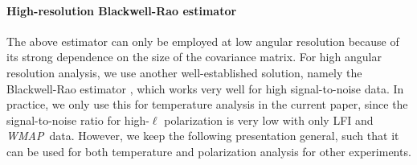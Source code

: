 \documentclass[onecolumn]{aa}
\def\WMAP{\emph{WMAP}}
\begin{document}
\paragraph{High-resolution Blackwell-Rao estimator}

The above estimator can only be employed at low angular resolution
because of its strong dependence on the size of the covariance
matrix. For high angular resolution analysis, we use another
well-established solution, namely the Blackwell-Rao estimator
\citep{chu2005}, which works very well for high signal-to-noise
data. In practice, we only use this for temperature analysis in the
current paper, since the signal-to-noise ratio for high-$\ell$
polarization is very low with only LFI and \WMAP\ data. However, we
keep the following presentation general, such that it can be used for
both temperature and polarization analysis for other experiments.
\end{document}

